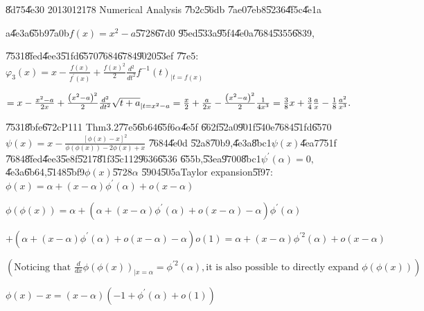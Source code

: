 \documentclass{article}
\begin{document}
\bigskip \U{8d75}\U{4e30} 2013012178 Numerical Analysis \U{7b2c}\U{56db}%
\U{7ae0}\U{7eb8}\U{5236}\U{4f5c}\U{4e1a}


\bigskip a\U{4e3a}\U{65b9}\U{7a0b}$f\left( x\right) =x^{2}-a$\U{5728}\U{67d0}%
\U{95ed}\U{533a}\U{95f4}\U{4e0a}\U{7684}\U{5355}\U{6839},

\U{7531}\U{8fed}\U{4ee3}\U{51fd}\U{6570}\U{7684}\U{6784}\U{9020}\U{53ef}%
\U{77e5}:$\varphi _{3}\left( x\right) =x-\frac{f\left( x\right) }{f^{\prime
}\left( x\right) }+\frac{f\left( x\right) ^{2}}{2}\frac{d^{2}}{dt^{2}}%
f^{-1}\left( t\right) _{|t=f\left( x\right) }$

$=x-\frac{x^{2}-a}{2x}+\frac{\left( x^{2}-a\right) ^{2}}{2}\frac{d^{2}}{%
dt^{2}}\sqrt{t+a}_{|t=x^{2}-a}=\frac{x}{2}+\frac{a}{2x}-\frac{\left(
x^{2}-a\right) ^{2}}{2}\frac{1}{4x^{3}}=\allowbreak \allowbreak \frac{3}{8}x+%
\frac{3}{4}\frac{a}{x}-\frac{1}{8}\frac{a^{2}}{x^{3}}.$


\U{7531}\U{8bfe}\U{672c}P111 Thm3.2\U{77e5}\U{6b64}\U{65f6}$\alpha $\U{4e5f}%
\U{662f}\U{52a0}\U{901f}\U{540e}\U{7684}\U{51fd}\U{6570}$\psi \left(
x\right) =x-\frac{\left[ \phi \left( x\right) -x\right] ^{2}}{\phi \left(
\phi \left( x\right) \right) -2\phi \left( x\right) +x}$ \U{7684}\U{4e0d}%
\U{52a8}\U{70b9},\U{4e3a}\U{8bc1}$\psi \left( x\right) $\U{4ea7}\U{751f}%
\U{7684}\U{8fed}\U{4ee3}\U{5e8f}\U{5217}\U{81f3}\U{5c11}2\U{9636}\U{6536}%
\U{655b},\U{53ea}\U{9700}\U{8bc1}$\psi ^{\prime }\left( \alpha \right) =0,$%
\U{4e3a}\U{6b64},\U{5148}\U{5bf9}$\phi \left( x\right) $\U{5728}$\alpha $%
\U{5904}\U{505a}Taylor expansion\U{5f97}: $\phi (x)=\alpha +\left( x-\alpha
\right) \phi ^{\prime }\left( \alpha \right) +o(x-\alpha )$

$\phi \left( \phi \left( x\right) \right) =\alpha +\left( \alpha +\left(
x-\alpha \right) \phi ^{\prime }\left( \alpha \right) +o(x-\alpha )-\alpha
\right) \phi ^{\prime }\left( \alpha \right) $

$+\left( \alpha +\left( x-\alpha \right) \phi ^{\prime }\left( \alpha
\right) +o(x-\alpha )-\alpha \right) o\left( 1\right) =\alpha +\left(
x-\alpha \right) \phi ^{\prime 2}\left( \alpha \right) +o(x-\alpha )$

$\left( \text{Noticing that }\frac{d}{dx}\phi \left( \phi \left( x\right)
\right) _{|x=\alpha }=\phi ^{\prime 2}\left( \alpha \right) ,\text{it is
also possible to directly expand }\phi \left( \phi \left( x\right) \right)
\right) $

$\phi \left( x\right) -x=\left( x-\alpha \right) \left( -1+\phi ^{\prime
}\left( \alpha \right) +o\left( 1\right) \right) $
\end{document}
